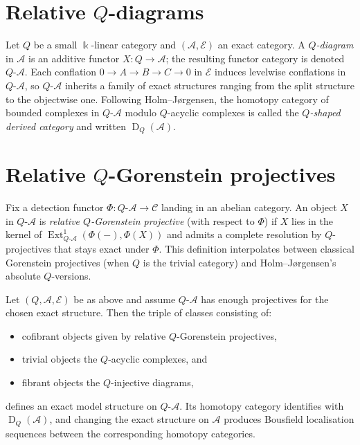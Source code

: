 \documentclass[12pt]{article}
\newcommand{\Ext}{\operatorname{Ext}}
\newcommand{\C}{\mathcal{C}}
\newcommand{\A}{\mathcal{A}}
\newcommand{\Der}{\operatorname{D}}
\begin{document}
\section*{Relative $Q$-diagrams}
Let $Q$ be a small $\Bbbk$-linear category and $(\A,\mathscr{E})$ an exact category.  A \emph{$Q$-diagram} in $\A$ is an additive functor $X\colon Q\to\A$; the resulting functor category is denoted $Q\text{-} \A$.  Each conflation $0\to A\to B\to C\to0$ in $\mathscr{E}$ induces levelwise conflations in $Q\text{-}\A$, so $Q\text{-}\A$ inherits a family of exact structures ranging from the split structure to the objectwise one.  Following Holm--J\o rgensen, the homotopy category of bounded complexes in $Q\text{-}\A$ modulo $Q$-acyclic complexes is called the \emph{$Q$-shaped derived category} and written $\Der_Q(\A)$.

\section*{Relative $Q$-Gorenstein projectives}
Fix a detection functor $\Phi\colon Q\text{-}\A\to\C$ landing in an abelian category.  An object $X$ in $Q\text{-}\A$ is \emph{relative $Q$-Gorenstein projective} (with respect to $\Phi$) if $X$ lies in the kernel of $\Ext^1_{Q\text{-}\A}(\Phi(-),\Phi(X))$ and admits a complete resolution by $Q$-projectives that stays exact under $\Phi$.  This definition interpolates between classical Gorenstein projectives (when $Q$ is the trivial category) and Holm--J\o rgensen's absolute $Q$-versions.

\begin{theorem}
Let $(Q,\A,\mathscr{E})$ be as above and assume $Q\text{-}\A$ has enough projectives for the chosen exact structure.  Then the triple of classes consisting of:
\begin{itemize}
  \item cofibrant objects given by relative $Q$-Gorenstein projectives,
  \item trivial objects the $Q$-acyclic complexes, and
  \item fibrant objects the $Q$-injective diagrams,
\end{itemize}
defines an exact model structure on $Q\text{-}\A$.  Its homotopy category identifies with $\Der_Q(\A)$, and changing the exact structure on $\A$ produces Bousfield localisation sequences between the corresponding homotopy categories.
\end{theorem}
\end{document}
